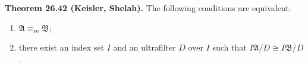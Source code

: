\textbf{Theorem 26.42 (Keisler, Shelah).} The following conditions are equivalent:

\begin{enumerate}
\item[(i)] $\mathfrak{A} \equiv_{\mathrm{ee}} \mathfrak{B}$;
\item[(ii)] there exist an index set $I$ and an ultrafilter $D$ over $I$ such that $I\mathfrak{A}/D \cong I\mathfrak{B}/D$.
\end{enumerate}
